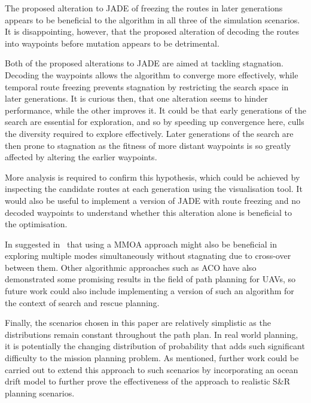 \documentclass[10pt,a4paper, oneside, conference]{IEEEtran}
\begin{document}
	The proposed alteration to JADE of freezing the routes in later generations appears to be beneficial to the algorithm in all three of the simulation scenarios.
	It is disappointing, however, that the proposed alteration of decoding the routes into waypoints before mutation appears to be detrimental.
	
	Both of the proposed alterations to JADE are aimed at tackling stagnation.
	Decoding the waypoints allows the algorithm to converge more effectively, while temporal route freezing prevents stagnation by restricting the search space in later generations.
	It is curious then, that one alteration seems to hinder performance, while the other improves it.
	It could be that early generations of the search are essential for exploration, and so by speeding up convergence here, culls the diversity required to explore effectively. Later generations of the search are then prone to stagnation as the fitness of more distant waypoints is so greatly affected by altering the earlier waypoints.
	
	More analysis is required to confirm this hypothesis, which could be achieved by inspecting the candidate routes at each generation using the visualisation tool.
	It would also be useful to implement a version of JADE with route freezing and no decoded waypoints to understand whether this alteration alone is beneficial to the optimisation.
	
	In suggested in~\cite{Yang2016} that using a MMOA approach might also be beneficial in exploring multiple modes simultaneously without stagnating due to cross-over between them.
	Other algorithmic approaches such as ACO have also demonstrated some promising results in the field of path planning for UAVs, so future work could also include implementing a version of such an algorithm for the context of search and rescue planning.
	
	 Finally, the scenarios chosen in this paper are relatively simplistic as the distributions remain constant throughout the path plan.
	 In real world planning, it is potentially the changing distribution of probability that adds such significant difficulty to the mission planning problem.
	 As mentioned, further work could be carried out to extend this approach to such scenarios by incorporating an ocean drift model to further prove the effectiveness of the approach to realistic S\&R planning scenarios.
	
%		
%		
%		
%	
\end{document}
